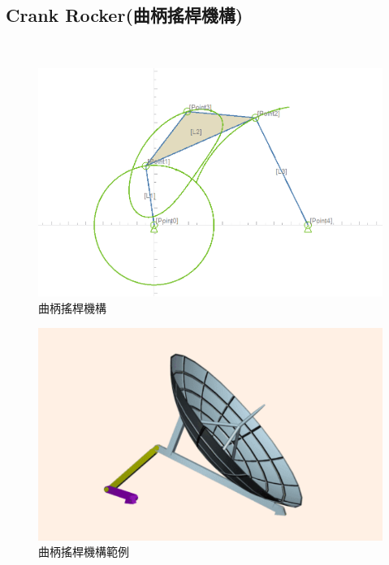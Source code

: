 \documentclass[14pt,a4paper]{report}  %
\newcommand{\fourteen}{\fontsize{14pt}{\baselineskip}\selectfont}%
\begin{document}
{    
       \hspace*{\fill} \\
       \subsection{Crank Rocker(曲柄搖桿機構)}
       \hspace*{\fill} \\        
        \fourteen {為4個連桿、5個接頭，2個雙接頭連桿、1個三接頭連桿所組成，如圖(5.3)，曲柄旋轉運動透過連接桿轉換至搖桿的搖擺運動，此四連桿機構構造最簡單也最常在生活周遭出現，如:老虎鉗、雷達調整機構、縫紉機腳踏機構、鋼材輸送機，如圖(5.4)。}
     \begin{figure}[H]
        \centering
        \includegraphics[scale=0.5]{曲柄搖桿機構.png} 
        \caption{曲柄搖桿機構} %
        \label{fig:scale} %
    \end{figure}
    \begin{figure}[H]
        \centering
        \includegraphics[scale=0.6]{曲柄搖桿機構範例.png} 
        \caption{曲柄搖桿機構範例} %
        \label{fig:scale} %
    \end{figure}
    
}
\end{document}
